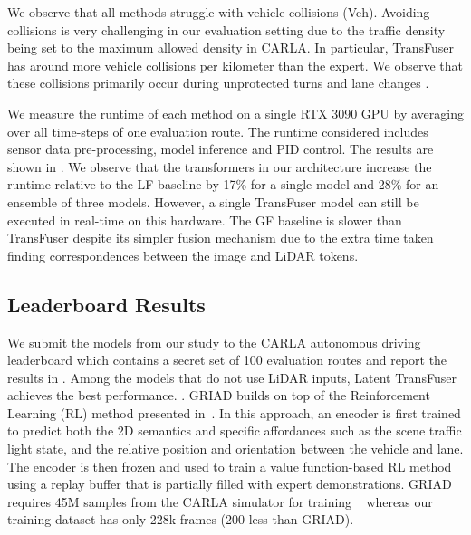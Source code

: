  We observe that all methods  struggle with vehicle collisions (Veh). Avoiding collisions is very challenging in our evaluation setting due to the traffic density being set to the maximum allowed density in CARLA. In particular, TransFuser has around  more vehicle collisions per kilometer than the expert. We observe that these collisions primarily occur during unprotected turns and lane changes .

 We measure the runtime of each method on a single RTX 3090 GPU by averaging over all time-steps of one evaluation route. The runtime considered includes sensor data pre-processing, model inference and PID control. The results are shown in . We observe that the transformers in our architecture increase the runtime relative to the LF baseline by 17\% for a single model and 28\% for an ensemble of three models. However, a single TransFuser model can still be executed in real-time on this hardware. The GF baseline is slower than TransFuser despite its simpler fusion mechanism due to the extra time taken finding correspondences between the image and LiDAR tokens.

\subsection{Leaderboard Results}
\label{sec:results_leaderboard}

We submit the models from our study to the CARLA autonomous driving leaderboard which contains a secret set of 100 evaluation routes and report the results in . Among the models that do not use LiDAR inputs, Latent TransFuser achieves the best performance. . GRIAD builds on top of the Reinforcement Learning (RL) method presented in~\cite{Toromanoff2020CVPR}. In this approach, an encoder is first trained to predict both the 2D semantics and specific affordances such as the scene traffic light state, and the relative position and orientation between the vehicle and lane. The encoder is then frozen and used to train a value function-based RL method using a replay buffer that is partially filled with expert demonstrations. GRIAD requires 45M samples from the CARLA simulator for training ~\cite{Chekroun2021ARXIV} whereas our training dataset has only 228k frames (200 less than GRIAD). 


